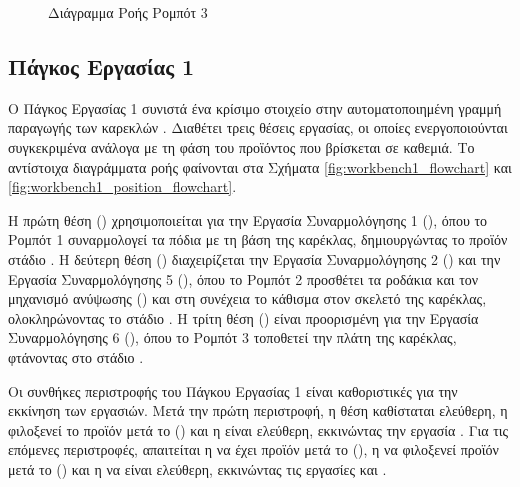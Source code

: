 \begin{figure}[H]
  \begin{center}
    \caption{Διάγραμμα Ροής Ρομπότ 3}
    \label{fig:robot3_flowchart}
  \end{center}
\end{figure}

\subsection{Πάγκος Εργασίας 1}
\noindent Ο Πάγκος Εργασίας 1 συνιστά ένα κρίσιμο στοιχείο στην αυτοματοποιημένη γραμμή παραγωγής των καρεκλών . Διαθέτει τρεις θέσεις εργασίας, οι οποίες ενεργοποιούνται συγκεκριμένα ανάλογα με τη φάση του προϊόντος που βρίσκεται σε καθεμιά. Το αντίστοιχα διαγράμματα ροής φαίνονται στα Σχήματα \ref{fig:workbench1_flowchart} και \ref{fig:workbench1_position_flowchart}.

Η πρώτη θέση () χρησιμοποιείται για την Εργασία Συναρμολόγησης 1 (), όπου το Ρομπότ 1 συναρμολογεί τα πόδια με τη βάση της καρέκλας, δημιουργώντας το προϊόν στάδιο . Η δεύτερη θέση () διαχειρίζεται την Εργασία Συναρμολόγησης 2 () και την Εργασία Συναρμολόγησης 5 (), όπου το Ρομπότ 2 προσθέτει τα ροδάκια και τον μηχανισμό ανύψωσης () και στη συνέχεια το κάθισμα στον σκελετό της καρέκλας, ολοκληρώνοντας το στάδιο . Η τρίτη θέση () είναι προορισμένη για την Εργασία Συναρμολόγησης 6 (), όπου το Ρομπότ 3 τοποθετεί την πλάτη της καρέκλας, φτάνοντας στο στάδιο .

Οι συνθήκες περιστροφής του Πάγκου Εργασίας 1 είναι καθοριστικές για την εκκίνηση των εργασιών. Μετά την πρώτη περιστροφή, η θέση  καθίσταται ελεύθερη, η  φιλοξενεί το προϊόν μετά το  () και η  είναι ελεύθερη, εκκινώντας την εργασία . Για τις επόμενες περιστροφές, απαιτείται η  να έχει προϊόν μετά το  (), η  να φιλοξενεί προϊόν μετά το  () και η  να είναι ελεύθερη, εκκινώντας τις εργασίες  και .

